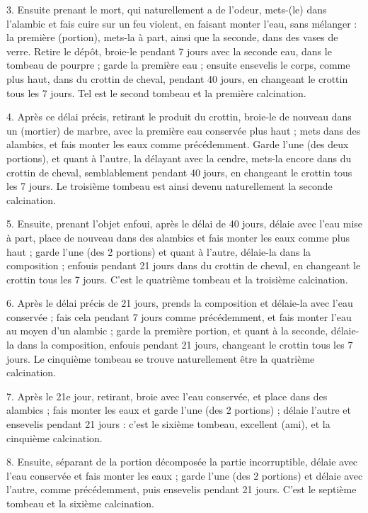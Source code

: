 \documentclass[a4paper, 11pt, oneside, polutonikogreek, french]{article}
\begin{document}
3. Ensuite prenant le mort, qui naturellement a de l'odeur, mets-(le) dans l'alambic et fais cuire sur un feu violent, en faisant monter l'eau, sans mélanger : la première (portion), mets-la à part, ainsi que la seconde, dans des vases de verre. Retire le dépôt, broie-le pendant 7 jours avec la seconde eau, dans le tombeau de pourpre ; garde la première eau ; ensuite ensevelis le corps, comme plus haut, dans du crottin de cheval, pendant 40 jours, en changeant le crottin tous les 7 jours. Tel est le second tombeau et la première calcination.

4. Après ce délai précis, retirant le produit du crottin, broie-le de nouveau dans un (mortier) de marbre, avec la première eau conservée plus haut ; mets dans des alambics, et fais monter les eaux comme précédemment. Garde l'une (des deux portions), et quant à l'autre, la délayant avec la cendre, mets-la encore dans du crottin de cheval, semblablement pendant 40 jours, en changeant le crottin tous les 7 jours. Le troisième tombeau est ainsi devenu naturellement la seconde calcination.

5. Ensuite, prenant l'objet enfoui, après le délai de 40 jours, délaie avec l'eau mise à part, place de nouveau dans des alambics et fais monter les eaux comme plus haut ; garde l'une (des 2 portions) et quant à l'autre, délaie-la dans la composition ; enfouis pendant 21 jours dans du crottin de cheval, en changeant le crottin tous les 7 jours. C'est le quatrième tombeau et la troisième calcination.

6. Après le délai précis de 21 jours, prends la composition et délaie-la avec l'eau conservée ; fais cela pendant 7 jours comme précédemment, et fais monter l'eau au moyen d'un alambic ; garde la première portion, et quant à la seconde, délaie-la dans la composition, enfouis pendant 21 jours, changeant le crottin tous les 7 jours. Le cinquième tombeau se trouve naturellement être la quatrième calcination.

7. Après le 21e jour, retirant, broie avec l'eau conservée, et place dans des alambics ; fais monter les eaux et garde l'une (des 2 portions) ; délaie l'autre et ensevelis pendant 21 jours : c'est le sixième tombeau, excellent (ami), et la cinquième calcination.

8. Ensuite, séparant de la portion décomposée la partie incorruptible, délaie avec l'eau conservée et fais monter les eaux ; garde l'une (des 2 portions) et délaie avec l'autre, comme précédemment, puis ensevelis pendant 21 jours. C'est le septième tombeau et la sixième calcination.
\end{document}
